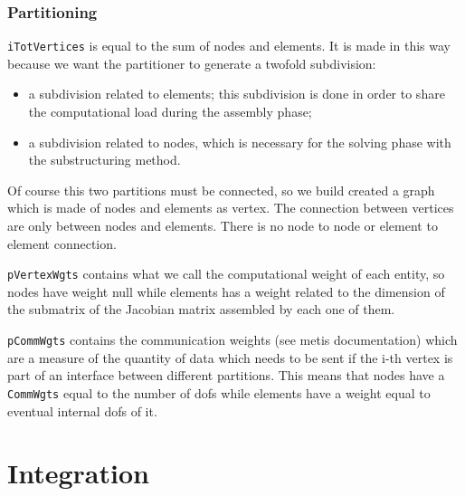 \documentclass[10pt,dvips]{report}
\begin{document}
\subsection{Partitioning}
\texttt{iTotVertices} is equal to the sum of nodes and elements. 
It is made in this way because we want the partitioner 
to generate a twofold subdivision:
\begin{itemize}
\item a subdivision related to elements; 
this subdivision is done in order to share the computational 
load during the assembly phase;
\item a subdivision related to nodes, 
which is necessary for the solving phase with the substructuring method.
\end{itemize}
Of course this two partitions must be connected, 
so we build created a graph which is made of nodes and elements as vertex. 
The connection between vertices are only between nodes and elements. 
There is no node to node or element to element connection.

\texttt{pVertexWgts} 
contains what we call the computational weight of each entity, 
so nodes have weight null while elements has a weight related to 
the dimension of the submatrix of the Jacobian matrix assembled
by each one of them.

\texttt{pCommWgts} contains the communication weights 
(see metis documentation) which are a measure of the quantity 
of data which needs to be sent if the i-th vertex is part 
of an interface between different partitions. 
This means that nodes have a \texttt{CommWgts} equal to the number 
of dofs while elements have a weight equal to eventual internal dofs of it.


\chapter{Integration}
\end{document}
